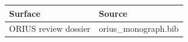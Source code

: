 \begin{tabular}{ll}Surface & Source\\\midrule ORIUS review dossier & orius\_monograph.bib\\\end{tabular}
